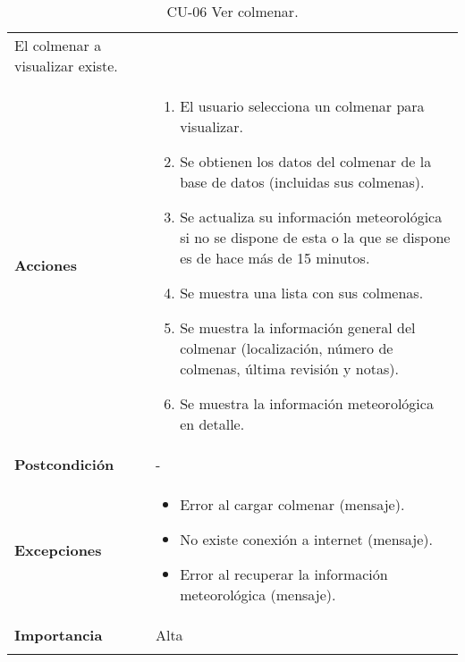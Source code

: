 \begin{longtable}[H]{@{}ll@{}}
\begin{minipage}[t]{0.76\columnwidth}
El colmenar a visualizar existe.\strut
\end{minipage}\tabularnewline
\begin{minipage}[t]{0.268\columnwidth}\raggedright\strut
\textbf{Acciones}\strut
\end{minipage} & \begin{minipage}[t]{0.76\columnwidth}\raggedright\strut
\begin{enumerate}
\def\labelenumi{\arabic{enumi}.}
\tightlist
\item
  El usuario selecciona un colmenar para visualizar.
\item
  Se obtienen los datos del colmenar de la base de datos (incluidas sus
  colmenas).
\item
  Se actualiza su información meteorológica si no se dispone de esta o
  la que se dispone es de hace más de 15 minutos.
\item
  Se muestra una lista con sus colmenas.
\item
  Se muestra la información general del colmenar (localización, número
  de colmenas, última revisión y notas).
\item
  Se muestra la información meteorológica en detalle.
\end{enumerate}\strut
\end{minipage}\tabularnewline
\begin{minipage}[t]{0.268\columnwidth}\raggedright\strut
\textbf{Postcondición}\strut
\end{minipage} & \begin{minipage}[t]{0.76\columnwidth}\raggedright\strut
-\strut
\end{minipage}\tabularnewline
\begin{minipage}[t]{0.268\columnwidth}\raggedright\strut
\textbf{Excepciones}\strut
\end{minipage} & \begin{minipage}[t]{0.76\columnwidth}\raggedright\strut
\begin{itemize}
\tightlist
\item
  Error al cargar colmenar (mensaje).
\item
  No existe conexión a internet (mensaje).
\item
  Error al recuperar la información meteorológica (mensaje).
\end{itemize}\strut
\end{minipage}\tabularnewline
\begin{minipage}[t]{0.268\columnwidth}\raggedright\strut
\textbf{Importancia}\strut
\end{minipage} & \begin{minipage}[t]{0.76\columnwidth}\raggedright\strut
Alta\strut
\end{minipage}\tabularnewline
\bottomrule
\caption{CU-06 Ver colmenar.}
\end{longtable}

